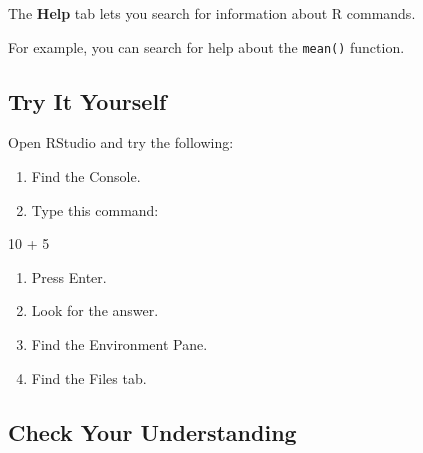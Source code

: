 \documentclass[
  letterpaper,
  DIV=11,
  numbers=noendperiod]{scrartcl}
\newenvironment{Shaded}{\begin{snugshade}}{\end{snugshade}}
\newcommand{\DecValTok}[1]{\textcolor[rgb]{0.68,0.00,0.00}{#1}}
\newcommand{\SpecialCharTok}[1]{\textcolor[rgb]{0.37,0.37,0.37}{#1}}
\providecommand{\tightlist}{%
  \setlength{\itemsep}{0pt}\setlength{\parskip}{0pt}}
\begin{document}
The \textbf{Help} tab lets you search for information about R commands.

For example, you can search for help about the \texttt{mean()} function.

\subsection{Try It Yourself}\label{try-it-yourself}

\begin{tcolorbox}[enhanced jigsaw, arc=.35mm, bottomrule=.15mm, bottomtitle=1mm, breakable, colback=white, colbacktitle=quarto-callout-note-color!10!white, colframe=quarto-callout-note-color-frame, coltitle=black, left=2mm, leftrule=.75mm, opacityback=0, opacitybacktitle=0.6, rightrule=.15mm, title=\textcolor{quarto-callout-note-color}{\faInfo}\hspace{0.5em}{Practice}, titlerule=0mm, toprule=.15mm, toptitle=1mm]

Open RStudio and try the following:

\begin{enumerate}
\def\labelenumi{\arabic{enumi}.}
\tightlist
\item
  Find the Console.
\item
  Type this command:
\end{enumerate}

\begin{Shaded}
\begin{Highlighting}[]
\DecValTok{10} \SpecialCharTok{+} \DecValTok{5}
\end{Highlighting}
\end{Shaded}

\begin{enumerate}
\def\labelenumi{\arabic{enumi}.}
\setcounter{enumi}{2}
\tightlist
\item
  Press Enter.
\item
  Look for the answer.
\item
  Find the Environment Pane.
\item
  Find the Files tab.
\end{enumerate}

\end{tcolorbox}

\subsection{Check Your Understanding}\label{check-your-understanding}
\end{document}
